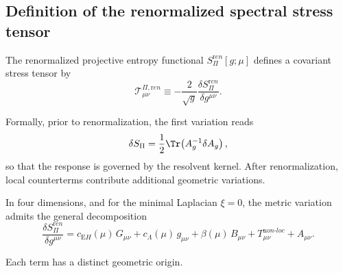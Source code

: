 \subsection{Definition of the renormalized spectral stress tensor}
  \label{subsec:spectral-stress}

  The renormalized projective entropy functional
  $S_\Pi^{\mathrm ren}[g;\mu]$ defines a covariant stress tensor by
  \begin{equation}
    \mathcal{T}^{\Pi,{\mathrm ren}}_{\mu\nu}
    \equiv
    -\frac{2}{\sqrt{g}}
    \frac{\delta S_\Pi^{\mathrm ren}}{\delta g^{\mu\nu}} .
  \end{equation}

  Formally, prior to renormalization, the first variation reads
  \begin{equation}
    \delta S_\Pi
    =
    \frac12 \Tr\!\left(A_g^{-1}\delta A_g\right),
  \end{equation}
  so that the response is governed by the resolvent kernel.
  After renormalization, local counterterms contribute additional
  geometric variations.

  In four dimensions, and for the minimal Laplacian $\xi=0$,
  the metric variation admits the general decomposition
  \begin{equation}
    \frac{\delta S_\Pi^{\mathrm ren}}{\delta g^{\mu\nu}}
    =
    c_{\mathrm EH}(\mu)\, G_{\mu\nu}
    +
    c_\Lambda(\mu)\, g_{\mu\nu}
    +
    \beta(\mu)\, B_{\mu\nu}
    +
    T^{\mathrm non\mbox{-}loc}_{\mu\nu}
    +
    A_{\mu\nu}.
    \label{eq:full-decomposition}
  \end{equation}

  Each term has a distinct geometric origin.
